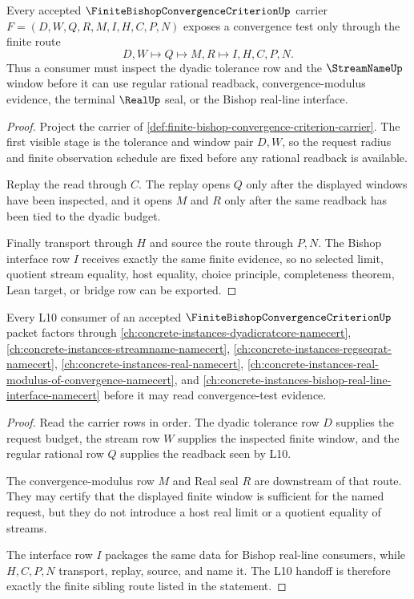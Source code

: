 \begin{theorem}
\label{thm:finite-bishop-convergence-criterion-window-test}
Every accepted $\FiniteBishopConvergenceCriterionUp$ carrier $F=(D,W,Q,R,M,I,H,C,P,N)$ exposes a convergence test only through the finite route
$$
D,W \longmapsto Q \longmapsto M,R \longmapsto I,H,C,P,N .
$$
Thus a consumer must inspect the dyadic tolerance row and the $\StreamNameUp$ window before it can use regular rational readback, convergence-modulus evidence, the terminal $\RealUp$ seal, or the Bishop real-line interface.
\end{theorem}
\begin{proof}
Project the carrier of \autoref{def:finite-bishop-convergence-criterion-carrier}. The first visible stage is the tolerance and window pair $D,W$, so the request radius and finite observation schedule are fixed before any rational readback is available.

Replay the read through $C$. The replay opens $Q$ only after the displayed windows have been inspected, and it opens $M$ and $R$ only after the same readback has been tied to the dyadic budget.

Finally transport through $H$ and source the route through $P,N$. The Bishop interface row $I$ receives exactly the same finite evidence, so no selected limit, quotient stream equality, host equality, choice principle, completeness theorem, Lean target, or bridge row can be exported.
\end{proof}

\begin{theorem}
\label{thm:finite-bishop-convergence-criterion-l10-handoff}
Every L10 consumer of an accepted $\FiniteBishopConvergenceCriterionUp$ packet factors through \autoref{ch:concrete-instances-dyadicratcore-namecert}, \autoref{ch:concrete-instances-streamname-namecert}, \autoref{ch:concrete-instances-regseqrat-namecert}, \autoref{ch:concrete-instances-real-namecert}, \autoref{ch:concrete-instances-real-modulus-of-convergence-namecert}, and \autoref{ch:concrete-instances-bishop-real-line-interface-namecert} before it may read convergence-test evidence.
\end{theorem}
\begin{proof}
Read the carrier rows in order. The dyadic tolerance row $D$ supplies the request budget, the stream row $W$ supplies the inspected finite window, and the regular rational row $Q$ supplies the readback seen by L10.

The convergence-modulus row $M$ and Real seal $R$ are downstream of that route. They may certify that the displayed finite window is sufficient for the named request, but they do not introduce a host real limit or a quotient equality of streams.

The interface row $I$ packages the same data for Bishop real-line consumers, while $H,C,P,N$ transport, replay, source, and name it. The L10 handoff is therefore exactly the finite sibling route listed in the statement.
\end{proof}

